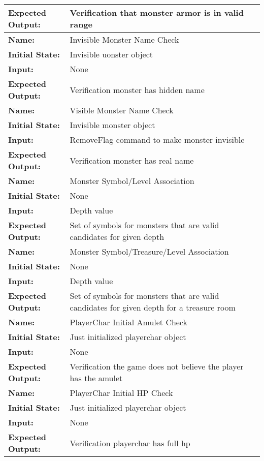 \documentclass[12pt, titlepage]{article}
\begin{document}
\begin{center}
\begin{longtable}{ l | p{10cm} }
				\textbf{Expected Output:} & Verification that monster armor is in valid range\\[1em]
				\hline
				\rule{0pt}{2em}\textbf{Name:} & Invisible Monster Name Check\\
				\textbf{Initial State:} & Invisible uonster object\\
				\textbf{Input:} & None\\
				\textbf{Expected Output:} & Verification monster has hidden name\\[1em]
				\hline
				\rule{0pt}{2em}\textbf{Name:} & Visible Monster Name Check\\
				\textbf{Initial State:} & Invisible monster object\\
				\textbf{Input:} & RemoveFlag command to make monster invisible\\
				\textbf{Expected Output:} & Verification monster has real name\\[1em]
				\hline
				\rule{0pt}{2em}\textbf{Name:} & Monster Symbol/Level Association\\
				\textbf{Initial State:} & None\\
				\textbf{Input:} & Depth value\\
				\textbf{Expected Output:} & Set of symbols for monsters that are valid candidates for given depth\\[1em]
				\hline
				\rule{0pt}{2em}\textbf{Name:} & Monster Symbol/Treasure/Level Association\\
				\textbf{Initial State:} & None\\
				\textbf{Input:} & Depth value\\
				\textbf{Expected Output:} & Set of symbols for monsters that are valid candidates for given depth for a treasure room\\[1em]
				\hline
				\rule{0pt}{2em}\textbf{Name:} & PlayerChar Initial Amulet Check\\
				\textbf{Initial State:} & Just initialized playerchar object\\
				\textbf{Input:} & None\\
				\textbf{Expected Output:} & Verification the game does not believe the player has the amulet\\[1em]
				\hline
				\rule{0pt}{2em}\textbf{Name:} & PlayerChar Initial HP Check\\
				\textbf{Initial State:} & Just initialized playerchar object\\
				\textbf{Input:} & None\\
				\textbf{Expected Output:} & Verification playerchar has full hp\\[1em]

\end{longtable}
\end{center}
\end{document}
